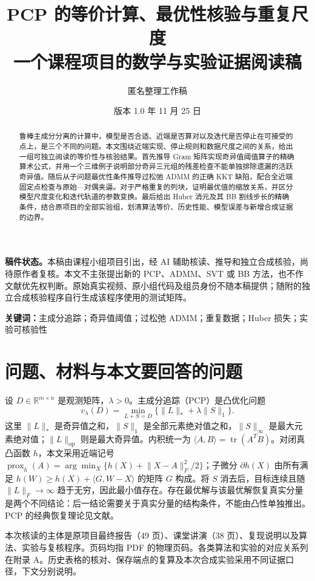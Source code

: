 \documentclass[UTF8,fontset=none,zihao=-4,a4paper]{ctexart}
\title{\vspace{-1.4em}\bfseries PCP 的等价计算、最优性核验与重复尺度\\[.4em]\large 一个课程项目的数学与实验证据阅读稿}
\author{匿名整理工作稿}
\date{版本 1.0\quad 2026 年 11 月 25 日}
\theoremstyle{plainzh}
\newcommand{\R}{\mathbb R}
\newcommand{\nuc}[1]{\lVert #1\rVert_*}
\newcommand{\op}[1]{\lVert #1\rVert_{\mathrm{op}}}
\newcommand{\fro}[1]{\lVert #1\rVert_F}
\newcommand{\ellone}[1]{\lVert #1\rVert_1}
\newcommand{\maxnorm}[1]{\lVert #1\rVert_\infty}
\newcommand{\ip}[2]{\langle #1,#2\rangle}
\newcommand{\prox}{\operatorname{prox}}
\numberwithin{equation}{section}
\begin{document}
\maketitle
\noindent\textbf{稿件状态。}本稿由课程小组项目引出，经 AI 辅助核读、推导和独立合成核验，尚待原作者复核。本文不主张提出新的 PCP、ADMM、SVT 或 BB 方法，也不作文献优先权判断。原始真实视频、原小组代码及组员身份不随本稿提供；随附的独立合成核验程序自行生成该程序使用的测试矩阵。
\begin{abstract}
鲁棒主成分分离的计算中，模型是否合适、近端是否算对以及迭代是否停止在可接受的点上，是三个不同的问题。本文围绕近端实现、停止规则和数据尺度之间的关系，给出一组可独立阅读的等价性与核验结果。首先推导 Gram 矩阵实现奇异值阈值算子的精确算术公式，并用一个三维例子说明部分奇异三元组的残差检查不能单独排除遗漏的活跃奇异值。随后从子问题最优性条件推导过松弛 ADMM 的正确 KKT 缺陷，配合全近端固定点检查与原始—对偶夹逼。对于严格重复的列块，证明最优值的缩放关系，并区分模型尺度变化和迭代轨道的参数变换。最后给出 Huber 消元及其 BB 割线步长的精确条件，结合原项目的全部实验组，划清算法等价、历史性能、模型误差与新增合成证据的边界。
\end{abstract}
\noindent\textbf{关键词：}主成分追踪；奇异值阈值；过松弛 ADMM；重复数据；Huber 损失；实验可核验性
\tableofcontents

\section{问题、材料与本文要回答的问题}
设 $D\in\R^{m\times n}$ 是观测矩阵，$\lambda>0$。主成分追踪（PCP）是凸优化问题
\begin{equation}\label{eq:pcp}
 v_\lambda(D)=\min_{L+S=D}\{\nuc L+\lambda\ellone S\}.
\end{equation}
这里 $\nuc L$ 是奇异值之和，$\ellone S$ 是全部元素绝对值之和，$\maxnorm S$ 是最大元素绝对值；$\op L$ 则是最大奇异值。内积统一为 $\ip AB=\operatorname{tr}(A^TB)$。对闭真凸函数 $h$，本文采用近端记号 $\prox_h(A)=\arg\min_X\{h(X)+\fro{X-A}^2/2\}$；子微分 $\partial h(X)$ 由所有满足 $h(W)\geq h(X)+\ip G{W-X}$ 的矩阵 $G$ 构成。将 $S$ 消去后，目标连续且随 $\fro L\to\infty$ 趋于无穷，因此最小值存在。存在最优解与该最优解恢复真实分量是两个不同结论：后一结论需要关于真实分量的结构条件，不能由凸性单独推出。PCP 的经典恢复理论见文献\cite{pcp}。

本次核读的主体是原项目最终报告（49 页）、课堂讲演（38 页）、复现说明以及算法、实验与复核程序。页码均指 PDF 的物理页码。各类算法和实验的对应关系列在附录 A。历史表格的核对、保存端点的复算及本次合成实验采用不同证据口径，下文分别说明。
\end{document}
